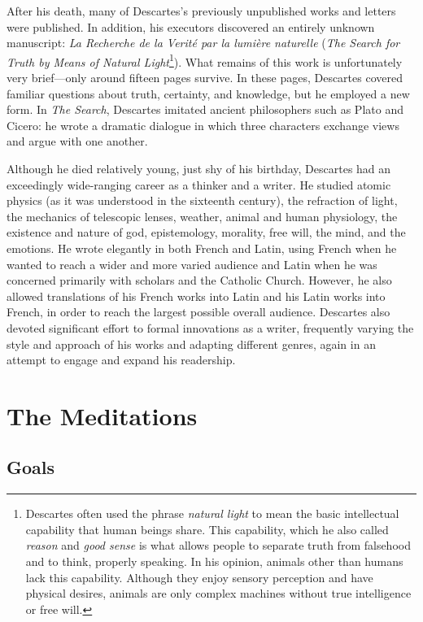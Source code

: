 After his death, many of Descartes's previously unpublished works and letters were published. In addition, his executors discovered an entirely unknown manuscript: \textit{La Recherche de la Verité par la lumière naturelle} (\textit{The Search for Truth by Means of Natural Light}\footnote{Descartes often used the phrase \textit{natural light} to mean the basic intellectual capability that human beings share. This capability, which he also called \textit{reason} and \textit{good sense} is what allows people to separate truth from falsehood and to think, properly speaking. In his opinion, animals other than humans lack this capability. Although they enjoy sensory perception and have physical desires, animals are only complex machines without true intelligence or free will.}). What remains of this work is unfortunately very brief---only around fifteen pages survive. In these pages, Descartes covered familiar questions about truth, certainty, and knowledge, but he employed a new form. In \textit{The Search}, Descartes imitated ancient philosophers such as Plato and Cicero: he wrote a dramatic dialogue in which three characters exchange views and argue with one another.

Although he died relatively young, just shy of his  birthday, Descartes had an exceedingly wide-ranging career as a thinker and a writer. He studied atomic physics (as it was understood in the sixteenth century), the refraction of light, the mechanics of telescopic lenses, weather, animal and human physiology, the existence and nature of god, epistemology, morality, free will, the mind, and the emotions. He wrote elegantly in both French and Latin, using French when he wanted to reach a wider and more varied audience and Latin when he was concerned primarily with scholars and the Catholic Church. However, he also allowed translations of his French works into Latin and his Latin works into French, in order to reach the largest possible overall audience. Descartes also devoted significant effort to formal innovations as a writer, frequently varying the style and approach of his works and adapting different genres, again in an attempt to engage and expand his readership.

\section{The Meditations}

\subsection*{Goals}

